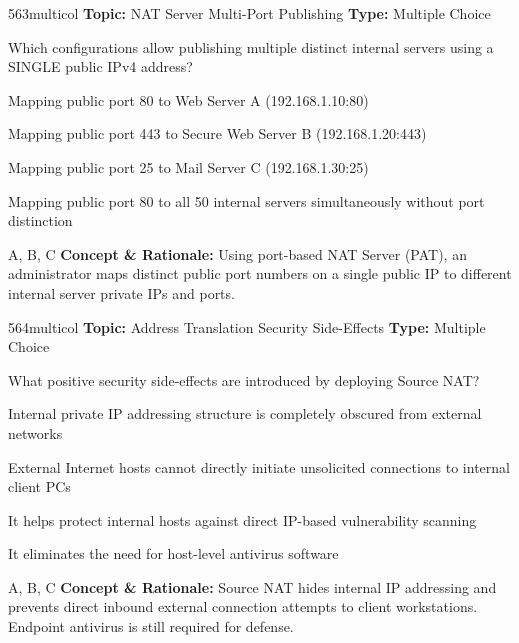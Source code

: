 \begin{qcard}{563}{multicol}
\textcolor{darkslate!75}{\small\textbf{Topic:} NAT Server Multi-Port Publishing \hfill \textbf{Type:} Multiple Choice}\vspace{0.4em}\par
Which configurations allow publishing multiple distinct internal servers using a SINGLE public IPv4 address?
\begin{qoptions}
\item Mapping public port 80 to Web Server A (192.168.1.10:80)
\item Mapping public port 443 to Secure Web Server B (192.168.1.20:443)
\item Mapping public port 25 to Mail Server C (192.168.1.30:25)
\item Mapping public port 80 to all 50 internal servers simultaneously without port distinction
\end{qoptions}
\end{qcard}
\nopagebreak
\begin{explainbox}{A, B, C}
\textbf{Concept \& Rationale:} Using port-based NAT Server (PAT), an administrator maps distinct public port numbers on a single public IP to different internal server private IPs and ports.
\end{explainbox}

\begin{qcard}{564}{multicol}
\textcolor{darkslate!75}{\small\textbf{Topic:} Address Translation Security Side-Effects \hfill \textbf{Type:} Multiple Choice}\vspace{0.4em}\par
What positive security side-effects are introduced by deploying Source NAT?
\begin{qoptions}
\item Internal private IP addressing structure is completely obscured from external networks
\item External Internet hosts cannot directly initiate unsolicited connections to internal client PCs
\item It helps protect internal hosts against direct IP-based vulnerability scanning
\item It eliminates the need for host-level antivirus software
\end{qoptions}
\end{qcard}
\nopagebreak
\begin{explainbox}{A, B, C}
\textbf{Concept \& Rationale:} Source NAT hides internal IP addressing and prevents direct inbound external connection attempts to client workstations. Endpoint antivirus is still required for defense.
\end{explainbox}

